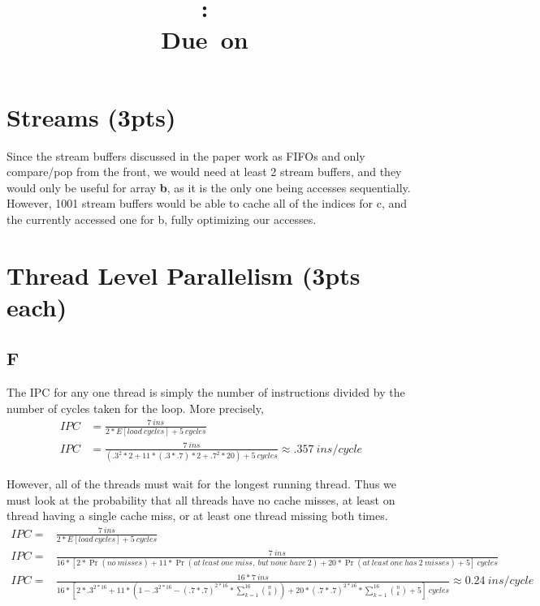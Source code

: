 \documentclass{article}
\title{
\vspace{2in}
\textmd{\textbf{\hmwkClass:\ \hmwkTitle}}\\
\normalsize\vspace{0.1in}\small{Due\ on\ \hmwkDueDate}\\
\vspace{0.1in}\large{\textit{\hmwkClassInstructor}}
\vspace{3in}
}
\author{\textbf{\hmwkAuthorName}}
\date{} %
\begin{document}
\maketitle
\newpage




%


\section{Streams (3pts)}
Since the stream buffers discussed in the paper work as FIFOs and only compare/pop from the front, we would need at least 2 stream buffers, and they would only be useful for array \textbf{b}, as it is the only one being accesses sequentially.  However, 1001 stream buffers would be able to cache all of the indices for c, and the currently accessed one for b, fully optimizing our accesses.  


\section{Thread Level Parallelism (3pts each)}

\subsection{F}
The IPC for any one thread is simply the number of instructions divided by the number of cycles taken for the loop. 
More precisely,
\begin{eqnarray*}
IPC &= \frac{7~ins}{2*E[load~cycles] +5~cycles}\\
IPC &= \frac{7~ins}{(.3^2*2+11*(.3*.7)*2+.7^2*20) +5~cycles} \approx .357~ins/cycle
\end{eqnarray*}

However, all of the threads must wait for the longest running thread.  Thus we must look at the probability that all threads have no cache misses, at least on thread having a single cache miss, or at least one thread missing both times.
\begin{eqnarray*}
IPC =& \frac{7~ins}{2*E[load~cycles] +5~cycles}\\
IPC =& \frac{7~ins}{16*[2*\Pr(no~misses) + 
11*\Pr(at~least~one~miss,~but~none~have~2) + 
20*\Pr(at~least~one~has~2~misses) +5]~cycles}\\
IPC =& \frac{16*7~ins}{16*[2*.3^{2*16}+11*(1 - .3^{2*16} - (.7*.7)^{2*16}*\sum_{k=1}^{16}\binom{n}{k})+20*(.7*.7)^{2*16}*\sum_{k=1}^{16}\binom{n}{k} + 5]~cycles} \approx 0.24~ins/cycle
\end{eqnarray*}
\end{document}
